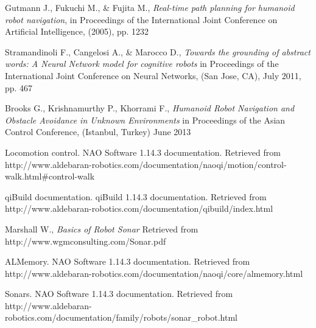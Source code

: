 \begin{thebibliography}{99}
    Gutmann J., Fukuchi M., \& Fujita M.,
    \emph{Real-time path planning for humanoid robot navigation},
    in Proceedings of the International Joint Conference on Artificial Intelligence,
    (2005),
    pp. 1232

	Stramandinoli F., Cangelosi A., \& Marocco D.,
	\emph{Towards the grounding of abstract words: A Neural Network model for cognitive robots}
	in Proceedings of the International Joint Conference on Neural Networks,
	(San Jose, CA),
	July 2011,
	pp. 467

	Brooks G., Krishnamurthy P., Khorrami F.,
	\emph{Humanoid Robot Navigation and Obstacle Avoidance in Unknown Environments}
	in Proceedings of the Asian Control Conference,
	(Istanbul, Turkey)
	June 2013

   	Locomotion control. 
   	NAO Software 1.14.3 documentation. 
   	Retrieved from http://www.aldebaran-robotics.com/documentation/naoqi/motion/control-walk.html\#control-walk

	qiBuild documentation.
	qiBuild 1.14.3 documentation.
	Retrieved from http://www.aldebaran-robotics.com/documentation/qibuild/index.html

	Marshall W.,
	\emph{Basics of Robot Sonar}
	Retrieved from http://www.wgmconsulting.com/Sonar.pdf

	ALMemory. 
   	NAO Software 1.14.3 documentation. 
	Retrieved from http://www.aldebaran-robotics.com/documentation/naoqi/core/almemory.html

	Sonars.
	NAO Software 1.14.3 documentation. 
	Retrieved from http://www.aldebaran-robotics.com/documentation/family/robots/sonar\_robot.html
\end{thebibliography}
